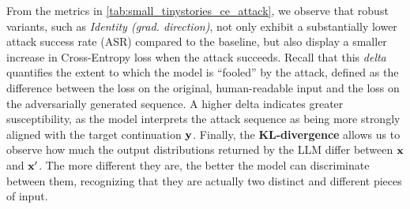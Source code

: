 \documentclass[../thesis.tex]{subfiles}
\begin{document}
From the metrics in \cref{tab:small_tinystories_ce_attack}, we observe that robust variants, such as \emph{Identity (grad. direction)}, not only exhibit a substantially lower attack success rate (ASR) compared to the baseline, but also display a smaller increase in Cross-Entropy loss when the attack succeeds.
Recall that this \emph{delta} quantifies the extent to which the model is ``fooled'' by the attack, defined as the difference between the loss on the original, human-readable input and the loss on the adversarially generated sequence.
A higher delta indicates greater susceptibility, as the model interprets the attack sequence as being more strongly aligned with the target continuation $\mathbf{y}$.
Finally, the \textbf{KL-divergence} allows us to observe how much the output distributions returned by the LLM differ between $\mathbf{x}$ and $\mathbf{x}'$. The more different they are, the better the model can discriminate between them, recognizing that they are actually two distinct and different pieces of input.

\begin{table}[htbp]
\vspace{0.25cm}
\caption{Evaluation of the attack input prefix and the target model alone}
\label{tab:small_tinystories_ce_attack}
\end{table}
\end{document}
